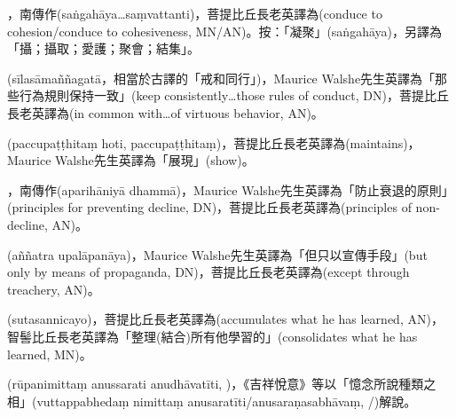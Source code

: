 \startitemgroup[noteitems]
\item{}，南傳作(saṅgahāya…saṃvattanti)，菩提比丘長老英譯為(conduce to cohesion/conduce to cohesiveness, MN/AN)。按：「凝聚」(saṅgahāya)，另譯為「攝；攝取；愛護；聚會；結集」。
\stopitemgroup

\startitemgroup[noteitems]
\item{}(sīlasāmaññagatā，相當於古譯的「戒和同行」)，Maurice Walshe先生英譯為「那些行為規則保持一致」(keep consistently…those rules of conduct, DN)，菩提比丘長老英譯為(in common with…of virtuous behavior, AN)。
\stopitemgroup

\startitemgroup[noteitems]
\item{}(paccupaṭṭhitaṃ hoti, paccupaṭṭhitaṃ)，菩提比丘長老英譯為(maintains)，Maurice Walshe先生英譯為「展現」(show)。
\stopitemgroup

\startitemgroup[noteitems]
\item{}，南傳作(aparihāniyā dhammā)，Maurice Walshe先生英譯為「防止衰退的原則」(principles for preventing decline, DN)，菩提比丘長老英譯為(principles of non-decline, AN)。
\stopitemgroup

\startitemgroup[noteitems]
\item{}(aññatra upalāpanāya)，Maurice Walshe先生英譯為「但只以宣傳手段」(but only by means of propaganda, DN)，菩提比丘長老英譯為(except through treachery, AN)。
\stopitemgroup

\startitemgroup[noteitems]
\item{}(sutasannicayo)，菩提比丘長老英譯為(accumulates what he has learned, AN)，智髻比丘長老英譯為「整理(結合)所有他學習的」(consolidates what he has learned, MN)。
\stopitemgroup

\startitemgroup[noteitems]
\item{}(rūpanimittaṃ anussarati anudhāvatīti, )，《吉祥悅意》等以「憶念所說種類之相」(vuttappabhedaṃ nimittaṃ anusaratīti/anusaraṇasabhāvaṃ, /)解說。
\stopitemgroup

